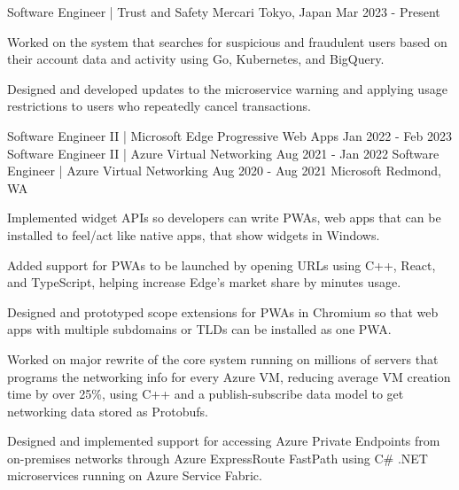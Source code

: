 

\begin{cventries}

    \cventry
    {Software Engineer | Trust and Safety} %
    {Mercari} %
    {Tokyo, Japan} %
    {Mar 2023 - Present} %
    {
        \begin{cvitems} %
            \item {Worked on the system that searches for suspicious and fraudulent users based on their account data and activity using Go, Kubernetes, and BigQuery.}
            \item {Designed and developed updates to the microservice warning and applying usage restrictions to users who repeatedly cancel transactions.}
        \end{cvitems}
    }

    \cventrythreepositions
    {Software Engineer II | Microsoft Edge Progressive Web Apps}
    {Jan 2022 - Feb 2023}
    {Software Engineer II | Azure Virtual Networking}
    {Aug 2021 - Jan 2022}
    {Software Engineer | Azure Virtual Networking}
    {Aug 2020 - Aug 2021}
    {Microsoft}
    {Redmond, WA}
    {
        \begin{cvitems} %
            \item {Implemented widget APIs so developers can write PWAs, web apps that can be installed to feel/act like native apps, that show widgets in Windows.}
            \item {Added support for PWAs to be launched by opening URLs using C++, React, and TypeScript, helping increase Edge's market share by minutes usage.}
            \item {Designed and prototyped scope extensions for PWAs in Chromium so that web apps with multiple subdomains or TLDs can be installed as one PWA.}
        \end{cvitems}
    }
    {
        \begin{cvitems} %
            \item {Worked on major rewrite of the core system running on millions of servers that programs the networking info for every Azure VM, reducing average VM creation time by over 25\%, using C++ and a publish-subscribe data model to get networking data stored as Protobufs.}
            \item {Designed and implemented support for accessing Azure Private Endpoints from on-premises networks through Azure ExpressRoute FastPath using C\# .NET microservices running on Azure Service Fabric.}
        \end{cvitems}
    }


\end{cventries}
